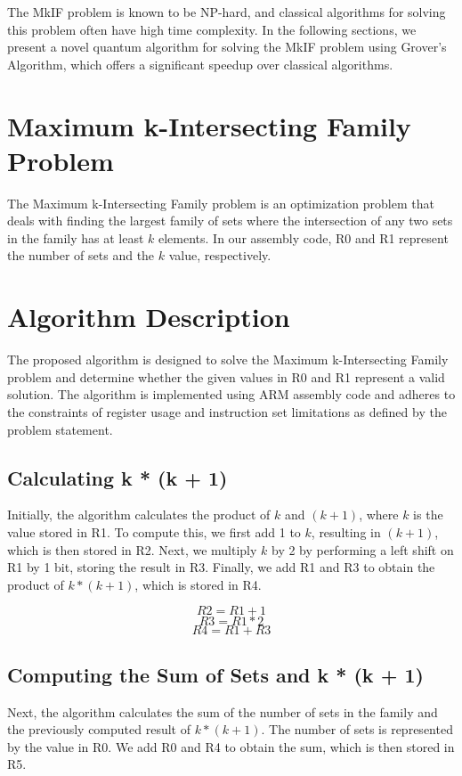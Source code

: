 The MkIF problem is known to be NP-hard, and classical algorithms for solving this problem often have high time complexity. In the following sections, we present a novel quantum algorithm for solving the MkIF problem using Grover's Algorithm, which offers a significant speedup over classical algorithms.

\section{Maximum k-Intersecting Family Problem}
The Maximum k-Intersecting Family problem is an optimization problem that deals with finding the largest family of sets where the intersection of any two sets in the family has at least $k$ elements. In our assembly code, R0 and R1 represent the number of sets and the $k$ value, respectively.

\section{Algorithm Description}
The proposed algorithm is designed to solve the Maximum k-Intersecting Family problem and determine whether the given values in R0 and R1 represent a valid solution. The algorithm is implemented using ARM assembly code and adheres to the constraints of register usage and instruction set limitations as defined by the problem statement.

\subsection{Calculating k * (k + 1)}
Initially, the algorithm calculates the product of $k$ and $(k + 1)$, where $k$ is the value stored in R1. To compute this, we first add 1 to $k$, resulting in $(k + 1)$, which is then stored in R2. Next, we multiply $k$ by 2 by performing a left shift on R1 by 1 bit, storing the result in R3. Finally, we add R1 and R3 to obtain the product of $k * (k + 1)$, which is stored in R4.

\begin{equation}
    R2 = R1 + 1
\end{equation}
\begin{equation}
    R3 = R1 * 2
\end{equation}
\begin{equation}
    R4 = R1 + R3
\end{equation}

\subsection{Computing the Sum of Sets and k * (k + 1)}
Next, the algorithm calculates the sum of the number of sets in the family and the previously computed result of $k * (k + 1)$. The number of sets is represented by the value in R0. We add R0 and R4 to obtain the sum, which is then stored in R5.

